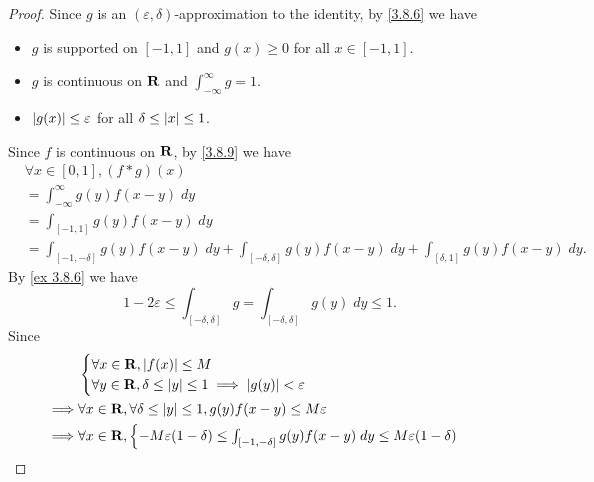 \begin{proof}
  Since \(g\) is an \((\varepsilon, \delta)\)-approximation to the identity, by \cref{3.8.6} we have
  \begin{itemize}
    \item \(g\) is supported on \([-1, 1]\) and \(g(x) \geq 0\) for all \(x \in [-1, 1]\).
    \item \(g\) is continuous on \(\mathbf{R}\) and \(\int_{-\infty}^\infty g = 1\).
    \item \(\left\lvert g(x)\right\rvert \leq \varepsilon\) for all \(\delta \leq \left\lvert x\right\rvert \leq 1\).
  \end{itemize}
  Since \(f\) is continuous on \(\mathbf{R}\), by \cref{3.8.9} we have
  \begin{align*}
     & \forall x \in [0, 1], (f * g)(x)                                                                                                    \\
     & = \int_{-\infty}^\infty g(y) f(x - y) \; dy                                                                                         \\
     & = \int_{[-1, 1]} g(y) f(x - y) \; dy                                                                                                \\
     & = \int_{[-1, -\delta]} g(y) f(x - y) \; dy + \int_{[-\delta, \delta]} g(y) f(x - y) \; dy + \int_{[\delta, 1]} g(y) f(x - y) \; dy.
  \end{align*}
  By \cref{ex 3.8.6} we have
  \[
    1 - 2 \varepsilon \leq \int_{[-\delta, \delta]} g = \int_{[-\delta, \delta]} g(y) \; dy \leq 1.
  \]
  Since
  \begin{align*}
             & \begin{cases}
                 \forall x \in \mathbf{R}, \left\lvert f(x)\right\rvert \leq M \\
                 \forall y \in \mathbf{R}, \delta \leq \left\lvert y\right\rvert \leq 1 \implies \left\lvert g(y)\right\rvert < \varepsilon
               \end{cases}                                                                         \\
    \implies & \forall x \in \mathbf{R}, \forall \delta \leq \left\lvert y\right\rvert \leq 1, g(y) f(x - y) \leq M \varepsilon                                                                \\
    \implies & \forall x \in \mathbf{R}, \begin{cases}
                                   -M \varepsilon (1 - \delta) \leq \int_{[-1, -\delta]} g(y) f(x - y) \; dy \leq M \varepsilon (1 - \delta) \\

\end{cases}
\end{align*}
\end{proof}
